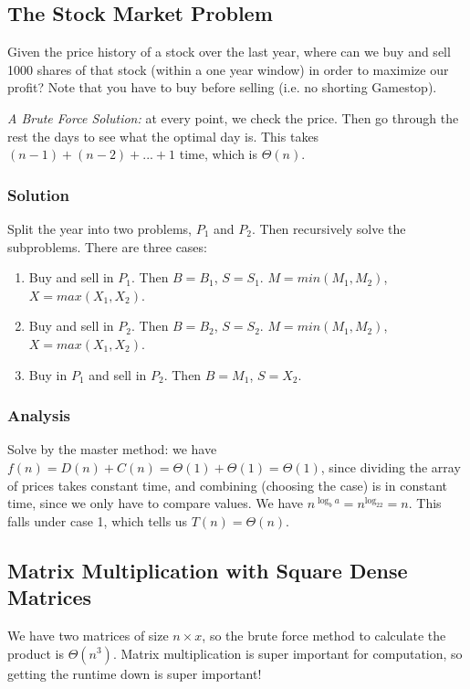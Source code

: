 \documentclass[11pt]{article}
\begin{document}
\subsection{The Stock Market Problem}
Given the price history of a stock over the last year, where can we buy and sell 1000 shares of that stock (within a one year window) in order to maximize our profit? Note that you have to buy before selling (i.e. no shorting Gamestop).

\textit{A Brute Force Solution:} at every point, we check the price. Then go through the rest the days to see what the optimal day is. This takes $(n-1) + (n-2) + ... + 1$ time, which is $\Theta(n)$.

\subsubsection{Solution}
Split the year into two problems, $P_1$ and $P_2$. Then recursively solve the subproblems. There are three cases:
\begin{enumerate}
    \item Buy and sell in $P_1$. Then $B = B_1$, $S = S_1$. $M = min(M_1, M_2)$, $X = max(X_1, X_2)$.
    \item Buy and sell in $P_2$. Then $B = B_2$, $S = S_2$. $M = min(M_1, M_2)$, $X = max(X_1, X_2)$. 
    \item Buy in $P_1$ and sell in $P_2$. Then $B = M_1$, $S = X_2$.
\end{enumerate}

\subsubsection{Analysis}
Solve by the master method: we have $f(n) = D(n) + C(n) = \Theta(1) + \Theta(1) = \Theta(1)$, since dividing the array of prices takes constant time, and combining (choosing the case) is in constant time, since we only have to compare values. We have $n^{\log_ba} = n^{\log_22} = n$. This falls under case 1, which tells us $T(n) = \Theta(n)$.

\subsection{Matrix Multiplication with Square Dense Matrices}
We have two matrices of size $n \times x$, so the brute force method to calculate the product is $\Theta(n^3)$. Matrix multiplication is super important for computation, so getting the runtime down is super important!
\end{document}
